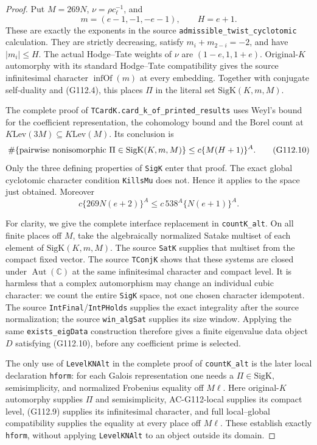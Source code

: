 \begin{proof}
Put \(M=269N\), \(\nu=\rho c_\ell^{-1}\), and
\[
 m=(e-1,-1,-e-1),\qquad H=e+1.
 \tag{G112.9}
\]
These are exactly the exponents in the source
\texttt{admissible\_twist\_cyclotomic} calculation.
They are strictly decreasing, satisfy \(m_i+m_{2-i}=-2\), and have
\(|m_i|\leq H\).  The actual Hodge--Tate weights of \(\nu\) are
\((1-e,1,1+e)\).  Original-\(K\) automorphy with its standard
Hodge--Tate compatibility gives the source infinitesimal character
\(\operatorname{infOf}(m)\) at every embedding.  Together with
conjugate self-duality and (G112.4), this places \(\Pi\) in the literal
set \(\mathrm{SigK}(K,m,M)\).

The complete proof of \texttt{TCardK.card\_k\_of\_printed\_results}
uses Weyl's bound for the coefficient representation, the cohomology
bound and the Borel count at \(K\mathrm{Lev}(3M)\subseteq
K\mathrm{Lev}(M)\).  Its conclusion is
\[
 \#\{\hbox{pairwise nonisomorphic }\Pi\in\mathrm{SigK}(K,m,M)\}
       \leq c\{M(H+1)\}^{A}.
       \tag{G112.10}
\]
Only the three defining properties of \texttt{SigK} enter that proof.
The exact global cyclotomic character condition \texttt{KillsMu} does
not.  Hence it applies to the space just obtained.  Moreover
\[
 c\{269N(e+2)\}^{A}
          \leq c\,538^{A}\{N(e+1)\}^{A}.
          \tag{G112.11}
\]

For clarity, we give the complete interface replacement in
\texttt{countK\_alt}.  On all finite places off \(M\), take the
algebraically normalized Satake multiset of each element of
\(\mathrm{SigK}(K,m,M)\).  The source \texttt{SatK} supplies that
multiset from the compact fixed vector.  The source \texttt{TConjK}
shows that these systems are closed under \(\operatorname{Aut}(\mathbb C)\)
at the same infinitesimal character and compact level.  It is harmless
that a complex automorphism may change an individual cubic character:
we count the entire \texttt{SigK} space, not one chosen character
idempotent.  The source \texttt{IntFinal}/\texttt{IntPHolds} supplies
the exact integrality after the source normalization; the source
\texttt{win\_algSat} supplies its size window.  Applying the same
\texttt{exists\_eigData} construction therefore gives a finite
eigenvalue data object \(D\) satisfying (G112.10), before any
coefficient prime is selected.

The only use of \texttt{LevelKNAlt} in the complete proof of
\texttt{countK\_alt} is the later local declaration \texttt{hform}:
for each Galois representation one needs a \(\Pi\in\mathrm{SigK}\),
semisimplicity, and normalized Frobenius equality off \(M\ell\).
Here original-\(K\) automorphy supplies \(\Pi\) and semisimplicity,
AC-G112-local supplies its compact level, (G112.9) supplies its
infinitesimal character, and full local--global compatibility supplies
the equality at every place off \(M\ell\).  These establish exactly
\texttt{hform}, without applying \texttt{LevelKNAlt} to an object
outside its domain.


\end{proof}
